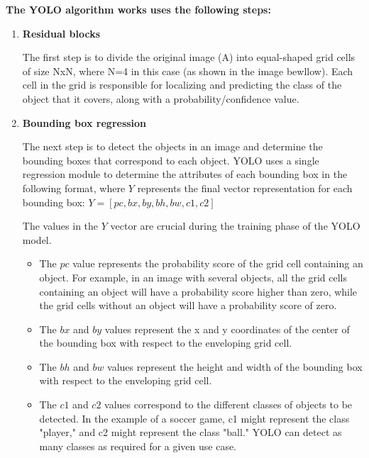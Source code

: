         \textbf{The YOLO algorithm works uses the following steps:}
        \begin{enumerate}

            \item \textbf{Residual blocks}
        
            The first step is to divide the original image (A) into equal-shaped grid cells of size NxN, where N=4 in this case (as shown in the image bewllow). 
            Each cell in the grid is responsible for localizing and predicting the class of the object that it covers, along with a probability/confidence value.
            
            \item \textbf{Bounding box regression}
        
            The next step is to detect the objects in an image and determine the bounding boxes that correspond to each object. 
            YOLO uses a single regression module to determine the attributes of each bounding box in the following format, where \(Y\) represents the final vector representation for each bounding box: \(Y = [pc, bx, by, bh, bw, c1, c2]\)
        
            The values in the \(Y\) vector are crucial during the training phase of the YOLO model.

            \begin{itemize}

            \item The \(pc\) value represents the probability score of the grid cell containing an object. For example, in an image with several objects, all the grid cells containing an object will have a probability score higher than zero, while the grid cells without an object will have a probability score of zero.
            \item The \(bx\) and \(by\) values represent the x and y coordinates of the center of the bounding box with respect to the enveloping grid cell.
            \item The \(bh\) and \(bw\) values represent the height and width of the bounding box with respect to the enveloping grid cell.
            \item The \(c1\) and \(c2\) values correspond to the different classes of objects to be detected. In the example of a soccer game, c1 might represent the class "player," and c2 might represent the class "ball." YOLO can detect as many classes as required for a given use case.
            \end{itemize}


\end{enumerate}
